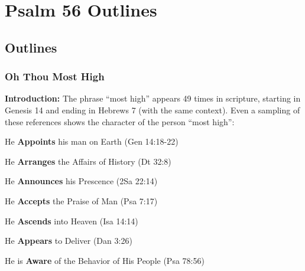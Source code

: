 \section{Psalm 56 Outlines}

\subsection{Outlines}

\subsubsection{Oh Thou Most High}
\textbf{Introduction: }The phrase ``most high'' appears 49 times in scripture, starting in Genesis 14 and ending in Hebrews 7 (with the same context).  Even a sampling of these references shows the character of the person ``most high'':
\begin{compactenum}[I.][8]
    \item He \textbf{Appoints} his man on Earth  (Gen 14:18-22)
    \item He \textbf{Arranges} the Affairs of History  (Dt 32:8)
    \item He \textbf{Announces} his Prescence  (2Sa 22:14)
    \item He \textbf{Accepts} the Praise of Man  (Psa 7:17)
    \item He \textbf{Ascends} into Heaven (Isa 14:14)
    \item He \textbf{Appears} to Deliver  (Dan 3:26)
    \item He is \textbf{Aware} of the Behavior of His People  (Psa 78:56)
\end{compactenum}